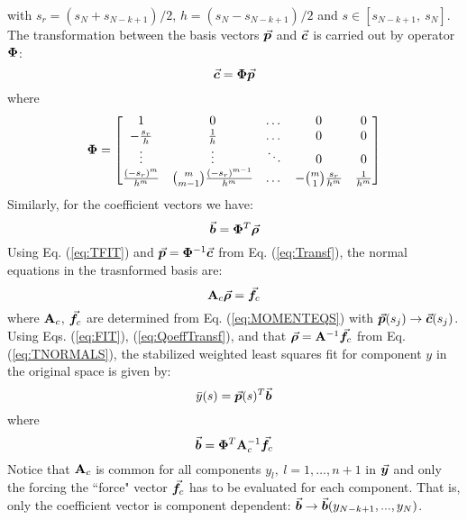 with $s_r=(s_N+s_{N-k+1})^{}/2$, $h=(s_N-s_{N-k+1})^{}/2$ and $s\in[s_{N-k+1},\
s_N]$. The transformation between the basis vectors $\vec{\bm{p}}$ and $\vec{\bm{c}}$ is
carried out by operator $\mathbf{\Phi}$:
\begin{equation}
	\vec{\bm{c}}=\mathbf{\Phi}\vec{\bm{p}}
	\label{eq:Transf}
\end{equation}
where
\begin{equation}
	\mathbf{\Phi} = \begin{bmatrix}
		1        &      0      & \dots & 0 & 0\\
		-\frac{s_r}{h} & \frac{1}{h} & \dots & 0 & 0\\
		\vdots     & \vdots      & \ddots& 0 & 0\\
		\frac{(-s_r)^m}{h^m} & \binom{m}{m-1}\frac{(-s_r)^{m-1}}{h^m} & \dots
		& -\binom{m}{1}\frac{s_r}{h^m} & \frac{1}{h^m}
	\end{bmatrix}
	\label{eq:OPERATOR}
\end{equation}
Similarly, for the coefficient vectors we have:
\begin{equation}
	\vec{\bm{b}}=\mathbf{\Phi}^T\vec{\bm{\rho}}
	\label{eq:QoeffTransf}
\end{equation}
Using Eq. (\ref{eq:TFIT}) and $\vec{\bm{p}}=\mathbf{\Phi}^{-1}\vec{\bm{c}}$ from Eq.
(\ref{eq:Transf}), 
the
normal equations in the trasnformed basis are:
\begin{equation}
	\mathbf{A}_c\vec{\bm{\rho}}=\vec{\bm{f}}_c
	\label{eq:TNORMALS}
\end{equation}
where $\mathbf{A}_c$, $\vec{\bm{f}}_c$ are determined from Eq. (\ref{eq:MOMENTEQS}) 
with
$\vec{\bm{p}}(s_j)\rightarrow \vec{\bm{c}}(s_j)$. Using Eqs.
(\ref{eq:FIT}), (\ref{eq:QoeffTransf}),
and that $\vec{\bm{\rho}}=\mathbf{A}^{-1}\vec{\bm{f}}_c$ from Eq. (\ref{eq:TNORMALS}), 
the 
stabilized weighted least squares fit for component $y$ in the original
space is given by:
\begin{equation}
	\bar{y}(s)=\vec{\bm{p}}(s)^T\vec{\bm{b}}
	\label{eq:SWLSF}
\end{equation}
where
\begin{equation}
	\vec{\bm{b}} = \mathbf{\Phi}^T\mathbf{A}_c^{-1}\vec{\bm{f}}_c
	\label{eq:compCoef}
\end{equation}
Notice that $\mathbf{A}_c$ is common for all components $y_l,\ l=1,\dots, n+1$ in
$\vec{\bm{y}}$ and only the forcing the ``force" vector $\vec{\bm{f}}_c$ has to be
evaluated for each component. That is, only the coefficient vector is component
dependent: $\vec{\bm{b}}\rightarrow \vec{\bm{b}}(y_{N-k+1},...,y_N)$. 

